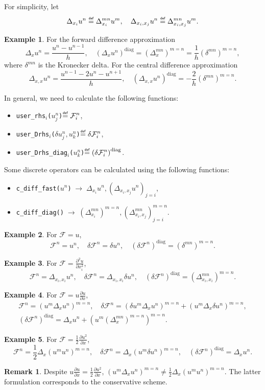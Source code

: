 \documentclass{article}
\newcommand{\pert}[1]{\delta#1}
\newcommand{\pder}[2][]{\frac{\partial#1}{\partial#2}}      %
\newcommand{\dder}[1]{\Delta_{#1}}                          %
\newcommand{\pderdual}[2][]{\frac{\partial^2#1}{\partial#2^2}}
\newcommand{\FF}{\mathcal{F}}
\newcommand{\diag}[1]{\left(#1\right)^\mathrm{diag}}
\newcommand{\diagA}[1]{\left(#1\right)^{m=n}}
\newcommand{\eqdef}{\mathrel{\overset{\makebox[0pt]{\mbox{\normalfont\tiny\sffamily def}}}{=}}}
\newcommand{\funcUser}[4]{\texttt{user\_#1\(_{#3}\)(\(#2\))}\(\eqdef\displaystyle#4\)}
\newcommand{\funcDiff}[3]{\texttt{c\_diff\_#1(\(#2\))}\(\;\longrightarrow\;#3\)}
\theoremstyle{definition}
\newtheorem{example}{Example}
\newtheorem{remark}{Remark}
\begin{document}
For simplicity, let
\begin{equation}\label{eq:dder}
     \dder{x_i}u^n\eqdef\dder{x_i}^{mn}u^m, \quad \dder{x_i,x_j}u^n\eqdef\dder{x_i,x_j}^{mn}u^m.
\end{equation}
\begin{example}
    For the forward difference approximation
    \[ \dder{x}u^n = \frac{u^n-u^{n-1}}{h}, \quad \diag{\dder{x}u^n} = \diagA{\dder{x}^{mn}} = \frac1h\diagA{\delta^{mn}}, \]
    where \(\delta^{mn}\) is the Kronecker delta.
    For the central difference approximation
    \[ \dder{x,x}u^n = \frac{u^{n-1}-2u^n-u^{n+1}}{h}, \quad \diag{\dder{x,x}u^n} = -\frac2h\diagA{\delta^{mn}}. \]
\end{example}
In general, we need to calculate the following functions:
\begin{itemize}
    \item \funcUser{rhs}{u_j^n}{i}{ \FF_i^n },
    \item \funcUser{Drhs}{\pert{u_j^n},u_k^n}{i}{ \pert{\FF_i^n} },
    \item \funcUser{Drhs\_diag}{u_k^n}{i}{ \diag{\pert{\FF_i^n}} }.
\end{itemize}
Some discrete operators can be calculated using the following functions:
\begin{itemize}
    \item \funcDiff{fast}{u^n}{\dder{x_i}u^n, (\dder{x_i,x_j}u^n)_{j=i}},
    \item \funcDiff{diag}{}{\diagA{\dder{x_i}^{mn}}, \diagA{\dder{x_i,x_j}^{mn}}_{j=i}}.
\end{itemize}
\begin{example}
    For \(\FF = u\), \[
        \FF^n = u^n, \quad \pert{\FF^n} = \pert{u^n}, \quad \diag{\pert{\FF^n}} = \diagA{\delta^{mn}}.
    \]
\end{example}
\begin{example}
    For \(\FF = \pderdual[u]{x_i}\), \[
        \FF^n = \dder{x_i,x_i}u^n, \quad
        \pert{\FF^n} = \dder{x_i,x_i}\pert{u^n}, \quad
        \diag{\pert{\FF^n}} = \diagA{\dder{x_i,x_i}^{mn}}.
    \]
\end{example}
\begin{example}
    For \(\FF = u\pder[u]{x}\), \[
        \begin{gathered}
        \FF^n = \diagA{u^m\dder{x}u^n}, \quad
        \pert{\FF^n} = \diagA{\pert{u^m}\dder{x}u^n} + \diagA{u^m\dder{x}\pert{u^n}}, \\
        \diag{\pert{\FF^n}} = \dder{x}u^n + \diagA{u^m\diagA{\dder{x}^{mn}}}.
        \end{gathered}
    \]
\end{example}
\begin{example}
    For \(\FF = \frac12\pder[u^2]{x}\), \[
        \FF^n = \frac12\dder{x}\diagA{u^mu^n}, \quad
        \pert{\FF^n} = \dder{x}\diagA{u^m\pert{u^n}}, \quad
        \diag{\pert{\FF^n}} = \dder{x}u^n.
    \]
\end{example}
\begin{remark}
    Despite \(u\pder[u]{x} = \frac12\pder[u^2]{x}\), \(\diagA{u^m\dder{x}u^n} \neq \frac12\dder{x}\diagA{u^mu^n}\).
    The latter formulation corresponds to the conservative scheme.
\end{remark}
\end{document}
